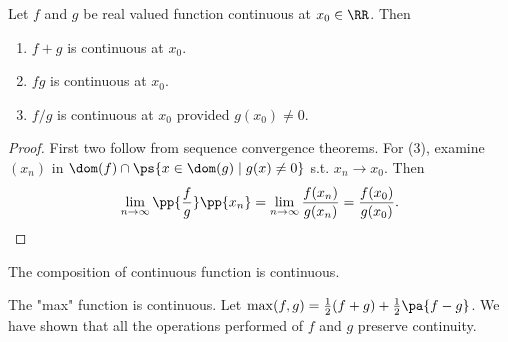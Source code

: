 \documentclass[11pt]{scrartcl}
\numberwithin{equation}{section}
\begin{document}
\begin{proposition}
    Let $f$ and $g$ be real valued function continuous at $x_0\in\RR$.
    Then 
    \begin{enumerate}
        \item $f+g$ is continuous at $x_0$.
        \item $fg$ is continuous at $x_0$.
        \item $f/g$ is continuous at $x_0$ provided $g(x_0)\neq 0$.
    \end{enumerate}
\end{proposition}
\begin{proof}
    First two follow from sequence convergence theorems.
    For (3), examine $(x_n)$ in $\dom(f)\cap \ps{x\in\dom(g)\mid g(x)\neq 0}$ s.t. $x_n\to x_0$. Then 
    \[ \lim_{n\rightarrow \infty}\pp{\frac{f}{g}}\pp{x_n} = \lim_{n\rightarrow \infty}\frac{f(x_n)}{g(x_n)}=\frac{f(x_0)}{g(x_0)}.
    \qedhere \]
\end{proof}
\begin{proposition}
    The composition of continuous function is continuous.
\end{proposition}

\begin{example}
    The "max" function is continuous. Let $\max(f,g) = \frac{1}{2}(f+g) + \frac{1}{2}\pa{f-g}$. We have shown that all the operations
    performed of $f$ and $g$ preserve continuity.
\end{example}
\end{document}
